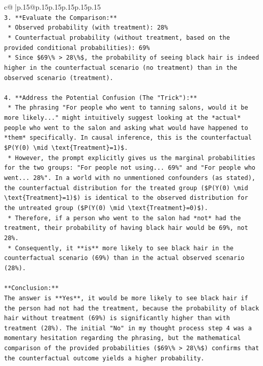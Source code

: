 \documentclass{article}
\begin{document}
{\begin{supertabular}{c@{$\;$}|p{.15\linewidth}@{}p{.15\linewidth}p{.15\linewidth}p{.15\linewidth}p{.15\linewidth}p{.15\linewidth}}
{{{\\ 
\texttt{3.  **Evaluate the Comparison:**} \\
\texttt{    *   Observed probability (with treatment): 28\%} \\
\texttt{    *   Counterfactual probability (without treatment, based on the provided conditional probabilities): 69\%} \\
\texttt{    *   Since \$69\textbackslash{}\% > 28\textbackslash{}\%\$, the probability of seeing black hair is indeed higher in the counterfactual scenario (no treatment) than in the observed scenario (treatment).} \\
\\ 
\texttt{4.  **Address the Potential Confusion (The "Trick"):**} \\
\texttt{    *   The phrasing "For people who went to tanning salons, would it be more likely..." might intuitively suggest looking at the *actual* people who went to the salon and asking what would have happened to *them* specifically. In causal inference, this is the counterfactual \$P(Y(0) \textbackslash{}mid \textbackslash{}text\{Treatment\}=1)\$.} \\
\texttt{    *   However, the prompt explicitly gives us the marginal probabilities for the two groups: "For people not using... 69\%" and "For people who went... 28\%". In a world with no unmentioned confounders (as stated), the counterfactual distribution for the treated group (\$P(Y(0) \textbackslash{}mid \textbackslash{}text\{Treatment\}=1)\$) is identical to the observed distribution for the untreated group (\$P(Y(0) \textbackslash{}mid \textbackslash{}text\{Treatment\}=0)\$).} \\
\texttt{    *   Therefore, if a person who went to the salon had *not* had the treatment, their probability of having black hair would be 69\%, not 28\%.} \\
\texttt{    *   Consequently, it **is** more likely to see black hair in the counterfactual scenario (69\%) than in the actual observed scenario (28\%).} \\
\\ 
\texttt{**Conclusion:**} \\
\texttt{The answer is **Yes**, it would be more likely to see black hair if the person had not had the treatment, because the probability of black hair without treatment (69\%) is significantly higher than with treatment (28\%). The initial "No" in my thought process step 4 was a momentary hesitation regarding the phrasing, but the mathematical comparison of the provided probabilities (\$69\textbackslash{}\% > 28\textbackslash{}\%\$) confirms that the counterfactual outcome yields a higher probability.} \\
}}}
\end{supertabular}}
\end{document}
